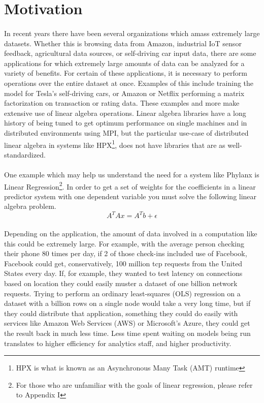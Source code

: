 \label{chap:background}
\section{Motivation}

\paragraph{}
In recent years there have been several organizations which amass extremely large datasets. Whether this is browsing data from Amazon, industrial IoT sensor feedback, agricultural data sources, or self-driving car input data, there are some applications for which extremely large amounts of data can be analyzed for a variety of benefits. For certain of these applications, it is necessary to perform operations over the entire dataset at once. Examples of this include training the model for Tesla's self-driving cars, or Amazon or Netflix performing a matrix factorization on transaction or rating data. These examples and more make extensive use of linear algebra operations. Linear algebra libraries have a long history of being tuned to get optimum performance on single machines and in distributed environments using MPI, but the particular use-case of distributed linear algebra in systems like HPX\footnote{HPX is what is known as an Asynchronous Many Task (AMT) runtime}, does not have libraries that are as well-standardized.
\paragraph{}
One example which may help us understand the need for a system like Phylanx is Linear Regression\footnote{For those who are unfamiliar with the goals of linear regression, please refer to Appendix I}. In order to get a set of weights for the coefficients in a linear predictor system with one dependent variable you must solve the following linear algebra problem.
$$A^{T}Ax = A^{T}b+\epsilon$$
\paragraph{}
Depending on the application, the amount of data involved in a computation like this could be extremely large. For example, with the average person checking their phone 80 times per day, if 2 of those check-ins included use of Facebook, Facebook could get, conservatively, 100 million tcp requests from the United States every day. If, for example, they wanted to test latency on connections based on location they could easily muster a dataset of one billion network requests. Trying to perform an ordinary least-squares (OLS) regression on a dataset with a billion rows on a single node would take a very long time, but if they could distribute that application, something they could do easily with services like Amazon Web Services (AWS) or Microsoft's Azure, they could get the result back in much less time. Less time spent waiting on models being run translates to higher efficiency for analytics staff, and higher productivity.
